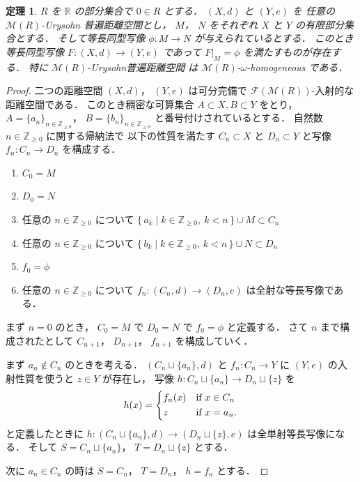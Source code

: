 \documentclass[leqno, 12pt]{jsarticle}
\newtheorem{thm}{定理}[section]
\newcommand{\zz}{\mathbb{Z}}
\newcommand{\yozz}[1]{\zz_{\ge #1}}
\newcommand{\rr}{\mathbb{R}}
\newcommand{\Met}[1]{\mathscr{M}(#1)}
\newcommand{\FinitePart}[1]{\mathscr{F}(#1)}
\newcommand{\FinMet}[1]{\FinitePart{\Met{#1}}}
\newcommand{\restr}[2]{#1|_{#2}}
\begin{document}
\begin{thm}\label{thm:pp:hom}
$R$
を
$\rr$
の部分集合で
$0\in R$
とする．
$(X, d)$
と
$(Y, e)$
を
任意の%
$\Met{R}$-Urysohn
普遍距離空間とし，
$M$，
$N$
をそれぞれ
$X$
と
$Y$
の有限部分集合とする．
そして等長同型写像
$\phi\colon  M\to N$
が与えられているとする．
このとき等長同型写像
$F\colon  (X, d)\to (Y, e)$
であって
$\restr{F}{M}=\phi$%
を満たすものが存在する．
特に
$\Met{R}$-Urysohn普遍距離空間
は%
$\Met{R}$-$\omega$-homogeneous
である．
\end{thm}
\begin{proof}
二つの距離空間
$(X, d)$，
$(Y, e)$
は可分完備で
$\FinMet{R}$-入射的な距離空間である．
このとき稠密な可算集合
$A\subset X, B\subset Y$
をとり，
$A=\{a_{n}\}_{n\in \yozz{0}}$，
$B=\{b_{n}\}_{n\in \yozz{0}}$
と番号付けされているとする．
自然数
$n\in \yozz{0}$%
に関する帰納法で
以下の性質を満たす
$C_{n}\subset X$
と
$D_{n}\subset Y$
と写像
$f_{n}\colon C_{n}\to D_{n}$%
を構成する．
\begin{enumerate}[label=\textup{(\arabic*)}]
\item
$C_{0}=M$
\item
$D_{0}=N$
\item
任意の%
$n\in \yozz{0}$%
について
$\{\,a_k\mid k\in\yozz{0},\ k<n\,\}\cup M\subset C_{n}$
\item
任意の
$n\in \yozz{0}$%
について
$\{\,b_k\mid k\in\yozz{0},\ k<n\,\}\cup N\subset D_{n}$
\item
$f_0=\phi$
\item
任意の
$n\in \yozz{0}$
について
$f_{n}\colon  (C_{n}, d)\to (D_{n}, e)$
は全射な等長写像である．
\end{enumerate}
まず
$n=0$
のとき，
$C_{0}=M$%
で
$D_{0}=N$%
で
$f_{0}=\phi$%
と定義する．
さて
$n$
まで構成されたとして
 $C_{n+1}$，
 $D_{n+1}$，
 $f_{n+1}$
 を構成していく．




まず
$a_{n}\not\in C_{n}$%
のときを考える．
$(C_{n}\sqcup\{a_{n}\}, d)$%
と
$f_{n}\colon  C_{n}\to Y$
に%
$(Y, e)$%
の入射性質を使うと
$z\in Y$%
が存在し，
写像
$h\colon  C_{n}\sqcup \{a_{n}\}\to D_{n}\sqcup \{z\}$
を
\[
h(x)=
\begin{dcases}
	f_{n}(x) & \text{if
$x\in C_{n}$%
}\\
	z & \text{if
$x=a_{n}$%
}.
\end{dcases}
\]
と定義したときに
$h\colon  (C_{n}\sqcup \{a_{n}\}, d)\to (D_{n}\sqcup \{z\}, e)$%
は全単射等長写像になる．
そして
$S=C_{n}\sqcup \{a_{n}\}$，
$T=D_{n}\sqcup\{z\}$%
とする．

次に
$a_{n}\in C_{n}$
の時は
$S=C_{n}$，
$T=D_{n}$，
$h=f_{n}$
とする．


\end{proof}
\end{document}

